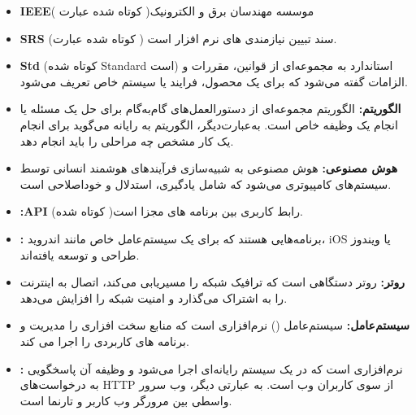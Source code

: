 \documentclass[12pt,a4paper,oneside]{article}
\begin{document}
			\begin{itemize}
				\item 
				\textbf{IEEE\rl{:}\label{ref:ieee}}( کوتاه شده عبارت
				)موسسه مهندسان برق و الکترونیک
		
				\item 
				\textbf{SRS\rl{:}\label{ref:srs}}
				(کوتاه شده عبارت 
				) 
				سند تبیین نیازمندی های نرم افزار است.
				
				\item
				\textbf{Std\rl{:}\label{ref:std}}
				(کوتاه شده Standard است)
				استاندارد به مجموعه‌ای از قوانین، مقررات و الزامات گفته می‌شود که برای یک محصول، فرایند یا سیستم خاص تعریف می‌شود.

				\item
					\textbf{الگوریتم:\label{ref:algorithm}}
					الگوریتم مجموعه‌ای از دستورالعمل‌های گام‌به‌گام برای حل یک مسئله یا انجام یک وظیفه خاص است. به‌عبارت‌دیگر، الگوریتم به رایانه می‌گوید برای انجام یک کار مشخص چه مراحلی را باید انجام دهد.

					\item 
					\textbf{هوش مصنوعی:\label{ref:ai}}
					هوش مصنوعی به شبیه‌سازی فرآیندهای هوشمند انسانی توسط سیستم‌های کامپیوتری می‌شود که شامل یادگیری، استدلال و خوداصلاحی است.

					\item 
					\textbf{:API\label{ref:api}}
					(کوتاه شده
					)رابط  کاربری بین برنامه های مجزا است.
					 \item 
					 \textbf{:\label{ref:nativeapp}} 
					 برنامه‌هایی هستند که برای یک سیستم‌عامل خاص مانند اندروید، iOS یا ویندوز طراحی و توسعه یافته‌اند.

					 \item 
					 \textbf{روتر:\label{ref:router}}
					  روتر دستگاهی است که ترافیک شبکه را مسیریابی می‌کند، اتصال به اینترنت را به اشتراک می‌گذارد و امنیت شبکه را افزایش می‌دهد.
					  
					  \item 
					  \textbf{سیستم‌عامل:\label{ref:os}}
					  سیستم‌عامل () نرم‌افزاری است که منابع سخت افزاری را مدیریت و برنامه های کاربردی را اجرا می کند.

					  \item 
					  \textbf{:\label{ref:webserver}} 
					  نرم‌افزاری است که در یک سیستم رایانه‌ای اجرا می‌شود و وظیفه آن پاسخگویی به درخواست‌های HTTP از سوی کاربران وب است. به عبارتی دیگر، وب سرور واسطی بین مرورگر وب کاربر و تارنما است.
					  

\end{itemize}
\end{document}
